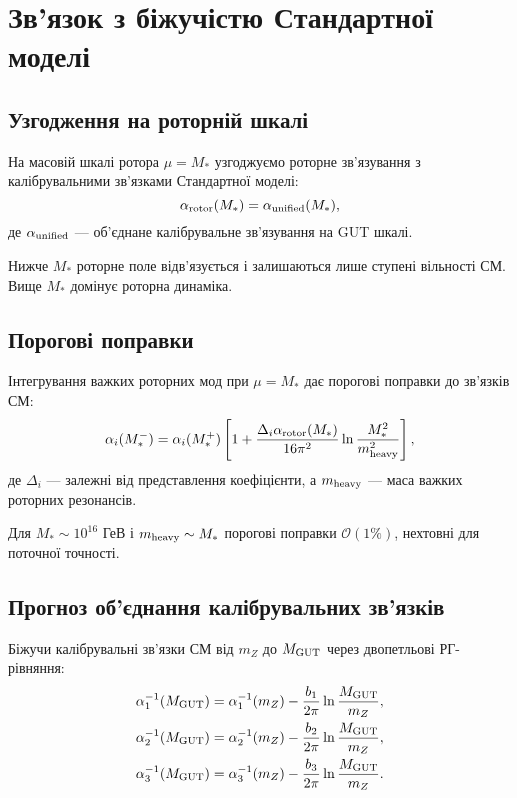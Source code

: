 \documentclass[11pt,a4paper]{article}
\numberwithin{equation}{section}
\theoremstyle{plain}
\theoremstyle{definition}
\theoremstyle{remark}
\begin{document}
\vspace{1em}

\section{Зв'язок з біжучістю Стандартної моделі}\label{sec:SM}

\subsection{Узгодження на роторній шкалі}

На масовій шкалі ротора $\mu=M_*$ узгоджуємо роторне зв'язування з калібрувальними зв'язками Стандартної моделі:
\begin{equation}
\alpha_{\rm rotor}(M_*) = \alpha_{\rm unified}(M_*),
\label{eq:matching}
\end{equation}
де $\alpha_{\rm unified}$ — об'єднане калібрувальне зв'язування на GUT шкалі.

Нижче $M_*$ роторне поле відв'язується і залишаються лише ступені вільності СМ. Вище $M_*$ домінує роторна динаміка.

\subsection{Порогові поправки}

Інтегрування важких роторних мод при $\mu=M_*$ дає порогові поправки до зв'язків СМ:
\begin{equation}
\alpha_i(M_*^-) = \alpha_i(M_*^+)\left[1 + \frac{\Delta_i\alpha_{\rm rotor}(M_*)}{16\pi^2}\ln\frac{M_*^2}{m_{\rm heavy}^2}\right],
\label{eq:threshold}
\end{equation}
де $\Delta_i$ — залежні від представлення коефіцієнти, а $m_{\rm heavy}$ — маса важких роторних резонансів.

Для $M_* \sim 10^{16}$ ГеВ і $m_{\rm heavy}\sim M_*$ порогові поправки $\mathcal{O}(1\%)$, нехтовні для поточної точності.

\subsection{Прогноз об'єднання калібрувальних зв'язків}

Біжучи калібрувальні зв'язки СМ від $m_Z$ до $M_{\rm GUT}$ через двопетльові РГ-рівняння:
\begin{align}
\alpha_1^{-1}(M_{\rm GUT}) &= \alpha_1^{-1}(m_Z) - \frac{b_1}{2\pi}\ln\frac{M_{\rm GUT}}{m_Z}, \notag\\
\alpha_2^{-1}(M_{\rm GUT}) &= \alpha_2^{-1}(m_Z) - \frac{b_2}{2\pi}\ln\frac{M_{\rm GUT}}{m_Z}, \notag\\
\alpha_3^{-1}(M_{\rm GUT}) &= \alpha_3^{-1}(m_Z) - \frac{b_3}{2\pi}\ln\frac{M_{\rm GUT}}{m_Z}.
\label{eq:RG-SM-running}
\end{align}
\end{document}
